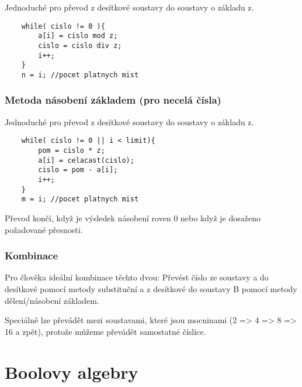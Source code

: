 \documentclass[a4paper, 11pt]{report}
\begin{document}
Jednoduché pro převod z desítkové soustavy do soustavy o základu z.

\begin{lstlisting}
	while( cislo != 0 ){
		a[i] = cislo mod z;
		cislo = cislo div z;
		i++;
	}
	n = i; //pocet platnych mist
\end{lstlisting}

\subsection{Metoda násobení základem (pro necelá čísla)}

Jednoduché pro převod z desítkové soustavy do soustavy o základu z.

\begin{lstlisting}
	while( cislo != 0 || i < limit){
		pom = cislo * z;
		a[i] = celacast(cislo);
		cislo = pom - a[i];
		i++;
	}
	m = i; //pocet platnych mist
\end{lstlisting}

Převod končí, když je výsledek násobení roven 0 nebo když je dosaženo požadované přesnosti.

\subsection{Kombinace}

Pro člověka ideální kombinace těchto dvou: Převést číslo ze soustavy a do desítkové pomocí metody substituční a z desítkové do soustavy B pomocí metody dělení/násobení základem.

Speciálně lze převádět mezi soustavami, které jsou mocninami (2 => 4 => 8 => 16 a zpět), protože můžeme převádět samostatné číslice.























\setcounter{chapter}{18}
\chapter{Boolovy algebry} \label{cha:19}
\end{document}
